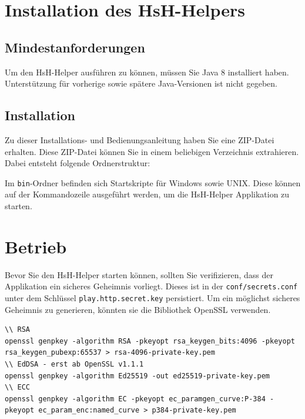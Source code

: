 \documentclass[12pt,DIV14,BCOR10mm,a4paper,parskip=half-,headsepline,headinclude,english,ngerman,bibliography=totocnumbered]{scrreprt}
\begin{document}
\vspace*{-3cm}

\tableofcontents  %

\chapter{Installation des HsH-Helpers}

\section{Mindestanforderungen}

Um den HsH-Helper ausführen zu können, müssen Sie Java 8 installiert haben.
Unterstützung für vorherige sowie spätere Java-Versionen ist nicht gegeben.

\section{Installation}

Zu dieser Installations- und Bedienungsanleitung haben Sie eine ZIP-Datei erhalten.
Diese ZIP-Datei können Sie in einem beliebigen Verzeichnis extrahieren.
Dabei entsteht folgende Ordnerstruktur: \\


\bigskip
Im \texttt{bin}-Ordner befinden sich Startskripte für Windows sowie UNIX.
Diese können auf der Kommandozeile ausgeführt werden, um die HsH-Helper Applikation zu starten.

\chapter{Betrieb}

Bevor Sie den HsH-Helper starten können, sollten Sie verifizieren, dass der Applikation ein sicheres Geheimnis vorliegt.
Dieses ist in der \texttt{conf/secrets.conf} unter dem Schlüssel \texttt{play.http.secret.key} persistiert.
Um ein möglichst sicheres Geheimnis zu generieren, könnten sie die Bibliothek OpenSSL verwenden.

\begin{lstlisting}[label=server-private-key, caption={OpenSSL-Befehl zum Erstellen eines privaten Schlüssels}, captionpos=b]
\\ RSA
openssl genpkey -algorithm RSA -pkeyopt rsa_keygen_bits:4096 -pkeyopt rsa_keygen_pubexp:65537 > rsa-4096-private-key.pem
\\ EdDSA - erst ab OpenSSL v1.1.1
openssl genpkey -algorithm Ed25519 -out ed25519-private-key.pem
\\ ECC
openssl genpkey -algorithm EC -pkeyopt ec_paramgen_curve:P-384 -pkeyopt ec_param_enc:named_curve > p384-private-key.pem
\end{lstlisting}
\end{document}

